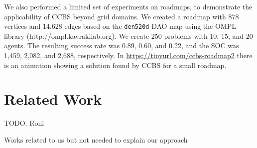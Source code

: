 \documentclass[review]{elsarticle}
\newcommand{\commentout}[1]{ }
\newcommand{\ccbs}{\ac{CCBS}\xspace}
\begin{document}
\commentout{
\begin{figure}
    \centering
    \texttt{[image: roadmap\_cropped.pdf]}
    \caption{The roadmap created for \texttt{den520d} DAO map.}
    \label{fig:roadmap}
\end{figure}
}
We also performed a limited set of experiments on roadmaps, to demonstrate the applicability of \ccbs beyond grid domains. 
We created a roadmap with 878 vertices and 14,628 edges based on the \texttt{den520d} DAO map using the OMPL library (http://ompl.kavrakilab.org). 
We create 250 problems with 10, 15, and 20 agents. The resulting success rate was 0.89, 0.60, and 0.22, 
and the SOC was 1,459, 2,082, and 2,688, respectively. 
In \url{https://tinyurl.com/ccbs-roadmap2} there is an animation showing a solution found by \ccbs for a small roadmap. 



\section{Related Work}
TODO: Roni

Works related to us but not needed to explain our approach


\end{document}
